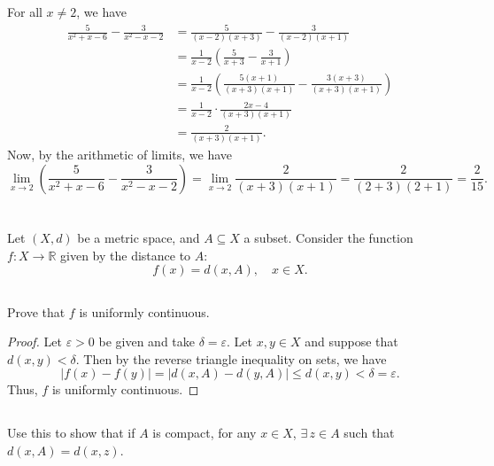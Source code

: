 \documentclass[12pt]{article}
\newenvironment{problem}
    {\begin{lrbox}{\mybox}\begin{minipage}{0.98\textwidth}}
    {\end{minipage}\end{lrbox}\framebox[\textwidth]{\usebox{\mybox}}}
\let\eps\varepsilon
\newcommand{\R}{\mathbb{R}}
\begin{document}
For all $x \ne 2$, we have
\begin{align*}
    \frac{5}{x^2 + x - 6} - \frac{3}{x^2 - x - 2}
        &= \frac{5}{(x - 2)(x + 3)} - \frac{3}{(x - 2)(x + 1)} \\[1em]
        &= \frac{1}{x-2} \left( \frac{5}{x + 3} - \frac{3}{x + 1} \right) \\[1em]
        &= \frac{1}{x-2} \left( \frac{5(x + 1)}{(x + 3)(x + 1)} - \frac{3(x + 3)}{(x + 3)(x + 1)} \right) \\[1em]
        &= \frac{1}{x-2} \cdot \frac{2x - 4}{(x + 3)(x + 1)} \\[1em]
        &= \frac{2}{(x + 3)(x + 1)}.
\end{align*}
Now, by the arithmetic of limits, we have
\[
    \lim_{x\to 2} \left ( \frac{5}{x^2+x-6} - \frac{3}{x^2-x-2}\right ) = \lim_{x\to 2} \frac{2}{(x + 3)(x + 1)} = \frac{2}{(2 + 3)(2 + 1)} = \frac{2}{15}.
\]

\newpage
\section{}
\begin{problem}
    Let $(X,d)$ be a metric space, and $A\subseteq X$ a subset. Consider the function $f:X\to \R$ given by the distance to $A$:
    \begin{equation}
        f(x) = d(x,A),\quad x\in X.
    \end{equation}
\end{problem}

\subsection{}
\begin{problem}
    Prove that $f$ is uniformly continuous.
\end{problem}

\begin{proof}
    Let $\eps > 0$ be given and take $\delta = \eps$. Let $x, y \in X$ and suppose that $d(x, y) < \delta$. Then by the reverse triangle inequality on sets, we have
    \[
        |f(x) - f(y)| = |d(x, A) - d(y, A)| \leq d(x, y) < \delta = \eps.
    \]
    Thus, $f$ is uniformly continuous.
    
\end{proof}


\subsection{}
\begin{problem}
    Use this to show that if $A$ is compact, for any $x \in X$, $\exists\, z\in A$ such that $d(x,A) = d(x,z)$.
\end{problem}
\end{document}
